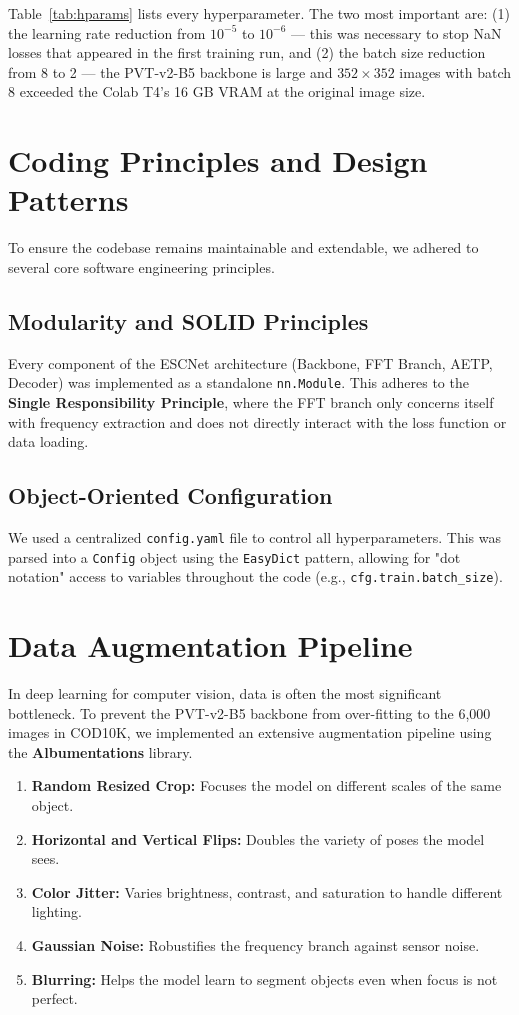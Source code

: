 \documentclass[12pt,a4paper]{report}
\begin{document}
\noindent Table~\ref{tab:hparams} lists every hyperparameter. The two most important are: (1) the learning rate reduction from $10^{-5}$ to $10^{-6}$ — this was necessary to stop NaN losses that appeared in the first training run, and (2) the batch size reduction from 8 to 2 — the PVT-v2-B5 backbone is large and $352 \times 352$ images with batch 8 exceeded the Colab T4's 16 GB VRAM at the original image size.

\section{Coding Principles and Design Patterns}

To ensure the codebase remains maintainable and extendable, we adhered to several core software engineering principles.

\subsection{Modularity and SOLID Principles}
Every component of the ESCNet architecture (Backbone, FFT Branch, AETP, Decoder) was implemented as a standalone \texttt{nn.Module}. This adheres to the \textbf{Single Responsibility Principle}, where the FFT branch only concerns itself with frequency extraction and does not directly interact with the loss function or data loading.

\subsection{Object-Oriented Configuration}
We used a centralized \texttt{config.yaml} file to control all hyperparameters. This was parsed into a \texttt{Config} object using the \texttt{EasyDict} pattern, allowing for "dot notation" access to variables throughout the code (e.g., \texttt{cfg.train.batch\_size}).

\section{Data Augmentation Pipeline}

In deep learning for computer vision, data is often the most significant bottleneck. To prevent the PVT-v2-B5 backbone from over-fitting to the 6,000 images in COD10K, we implemented an extensive augmentation pipeline using the \textbf{Albumentations} library.

\begin{enumerate}
    \item \textbf{Random Resized Crop:} Focuses the model on different scales of the same object.
    \item \textbf{Horizontal and Vertical Flips:} Doubles the variety of poses the model sees.
    \item \textbf{Color Jitter:} Varies brightness, contrast, and saturation to handle different lighting.
    \item \textbf{Gaussian Noise:} Robustifies the frequency branch against sensor noise.
    \item \textbf{Blurring:} Helps the model learn to segment objects even when focus is not perfect.
\end{enumerate}
\end{document}
